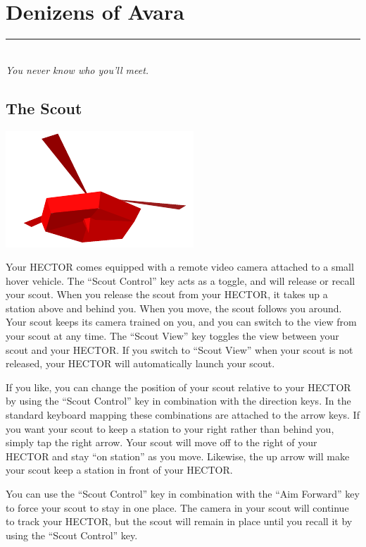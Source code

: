 \documentclass{article}
\let\oldsection\section
\renewcommand\section{\clearpage\oldsection}
\begin{document}
\section{Denizens of Avara}
\rule{5.5cm}{.15pt}\\
\rmfamily\textit{You never know who you'll meet.}

\subsection{The Scout}
\begin{center}
	\includegraphics{img/11.pdf}
\end{center}

Your HECTOR comes equipped with a remote video camera attached to a small hover vehicle. The ``Scout Control'' key acts as a toggle, and will release or recall your scout. When you release the scout from your HECTOR, it takes up a station above and behind you. When you move, the scout follows you around. Your scout keeps its camera trained on you, and you can switch to the view from your scout at any time. The ``Scout View'' key toggles the view between your scout and your HECTOR. If you switch to ``Scout View'' when your scout is not released, your HECTOR will automatically launch your scout.

If you like, you can change the position of your scout relative to your HECTOR by using the ``Scout Control'' key in combination with the direction keys. In the standard keyboard mapping these combinations are attached to the arrow keys. If you want your scout to keep a station to your right rather than behind you, simply tap the right arrow. Your scout will move off to the right of your HECTOR and stay ``on station'' as you move. Likewise, the up arrow will make your scout keep a station in front of your HECTOR.

You can use the ``Scout Control'' key in combination with the ``Aim Forward'' key to force your scout to stay in one place. The camera in your scout will continue to track your HECTOR, but the scout will remain in place until you recall it by using the ``Scout Control'' key.
\end{document}
